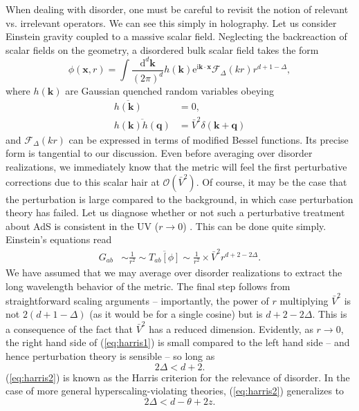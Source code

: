 \documentclass[10pt, oneside]{book}
\begin{document}
\begin{doublespace}
When dealing with disorder, one must be careful to revisit the notion of relevant vs. irrelevant operators.  We can see this simply in holography.   Let us consider Einstein gravity coupled to a massive scalar field.  Neglecting the backreaction of scalar fields on the geometry, a disordered bulk scalar field takes the form \begin{equation}
\phi(\mathbf{x},r) = \int \frac{\mathrm{d}^d\mathbf{k}}{(2\pi)^d} h(\mathbf{k}) \mathrm{e}^{\mathrm{i}\mathbf{k}\cdot\mathbf{x}} \mathcal{F}_\Delta(kr)  r^{d+1-\Delta},
\end{equation}
where $h(\mathbf{k})$ are Gaussian quenched random variables obeying \begin{subequations}\begin{align}
\overline{h(\mathbf{k})} &= 0, \\
\overline{h(\mathbf{k}) h(\mathbf{q})} &=  \bar V^2  \delta(\mathbf{k}+\mathbf{q})  \label{eq:vbar}
\end{align}\end{subequations}
and $\mathcal{F}_\Delta(kr)$ can be expressed in terms of modified Bessel functions.  Its precise form is tangential to our discussion.  Even before averaging over disorder realizations, we immediately know that the metric will feel the first perturbative corrections due to this scalar hair at $\mathcal{O}(\bar V^2)$.   Of course, it may be the case that the perturbation is large compared to the background, in which case perturbation theory has failed.   Let us diagnose whether or not such a perturbative treatment about AdS is consistent in the UV ($r\rightarrow 0$) \cite{lucas1401}.   This can be done quite simply.  Einstein's equations read \begin{align}
G_{ab} &\sim \frac{1}{r^2} \sim \overline{T_{ab}[\phi]} \sim \frac{1}{r^2} \times \bar V^2 r^{d+2-2\Delta}.  \label{eq:harris1}
\end{align}
We have assumed that we may average over disorder realizations to extract the long wavelength behavior of the metric.   The final step follows from straightforward scaling arguments -- importantly, the power of $r$ multiplying $\bar V^2$ is not $2(d+1-\Delta)$ (as it would be for a single cosine) but is $d+2-2\Delta$.   This is a consequence of the fact that $\bar V^2$ has a reduced dimension.   Evidently, as $r\rightarrow 0$, the right hand side of (\ref{eq:harris1}) is small compared to the left hand side -- and hence perturbation theory is sensible -- so long as \begin{equation}
2\Delta < d+2. \label{eq:harris2}
\end{equation}
(\ref{eq:harris2}) is known as the Harris criterion for the relevance of disorder.   In the case of more general hyperscaling-violating theories, (\ref{eq:harris2}) generalizes to \cite{lucas1401} \begin{equation}
2\Delta < d-\theta+2z.
\end{equation}


\end{doublespace}
\end{document}
